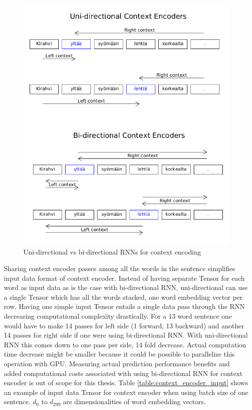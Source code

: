 \documentclass[12pt,a4paper,english
]{tutthesis}
\begin{document}
\begin{figure}[htbp]
\caption{Uni-directional vs bi-directional RNNs for context encoding}
\label{figure:uni_vs_bi}
\centering
\includegraphics[width=15cm]{uni_vs_bi.png}
\end{figure}

Sharing context encoder passes among all the words in the sentence simplifies input data format of context encoder. Instead of having separate Tensor for each word as input data as is the case with bi-directional RNN, uni-directional can use a single Tensor which has all the words stacked, one word embedding vector per row. Having one simple input Tensor entails a single data pass through the RNN decreasing computational complexity drastically. For a 13 word sentence one would have to make 14 passes for left side (1 forward, 13 backward) and another 14 passes for right side if one were using bi-directional RNN. With uni-directional RNN this comes down to one pass per side, 14 fold decrease. Actual computation time decrease might be smaller because it could be possible to parallelize this operation with GPU. Measuring actual prediction performance benefits and added computational costs associated with using bi-directional RNN for context encoder is out of scope for this thesis. Table \ref{table:context_encoder_input} shows an example of input data Tensor for context encoder when using batch size of one sentence. $d_0$ to $d_{299}$ are dimensionalities of word embedding vectors.
\end{document}
